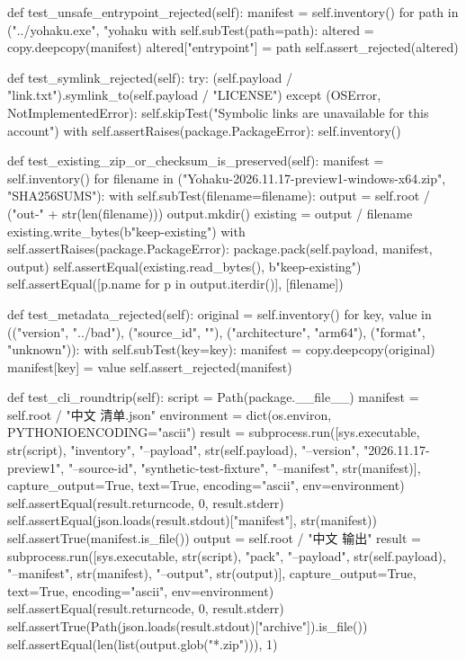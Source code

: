     def test_unsafe_entrypoint_rejected(self):
        manifest = self.inventory()
        for path in ("../yohaku.exe", "yohaku%
            with self.subTest(path=path):
                altered = copy.deepcopy(manifest)
                altered["entrypoint"] = path
                self.assert_rejected(altered)

    def test_symlink_rejected(self):
        try:
            (self.payload / "link.txt").symlink_to(self.payload / "LICENSE")
        except (OSError, NotImplementedError):
            self.skipTest("Symbolic links are unavailable for this account")
        with self.assertRaises(package.PackageError):
            self.inventory()

    def test_existing_zip_or_checksum_is_preserved(self):
        manifest = self.inventory()
        for filename in ("Yohaku-2026.11.17-preview1-windows-x64.zip", "SHA256SUMS"):
            with self.subTest(filename=filename):
                output = self.root / ("out-" + str(len(filename)))
                output.mkdir()
                existing = output / filename
                existing.write_bytes(b"keep-existing")
                with self.assertRaises(package.PackageError):
                    package.pack(self.payload, manifest, output)
                self.assertEqual(existing.read_bytes(), b"keep-existing")
                self.assertEqual([p.name for p in output.iterdir()], [filename])

    def test_metadata_rejected(self):
        original = self.inventory()
        for key, value in (("version", "../bad"), ("source_id", ""),
                           ("architecture", "arm64"), ("format", "unknown")):
            with self.subTest(key=key):
                manifest = copy.deepcopy(original)
                manifest[key] = value
                self.assert_rejected(manifest)

    def test_cli_roundtrip(self):
        script = Path(package.__file__)
        manifest = self.root / "中文 清单.json"
        environment = dict(os.environ, PYTHONIOENCODING="ascii")
        result = subprocess.run([sys.executable, str(script), "inventory", "--payload", str(self.payload),
                                 "--version", "2026.11.17-preview1", "--source-id", "synthetic-test-fixture",
                                 "--manifest", str(manifest)], capture_output=True, text=True,
                                encoding="ascii", env=environment)
        self.assertEqual(result.returncode, 0, result.stderr)
        self.assertEqual(json.loads(result.stdout)["manifest"], str(manifest))
        self.assertTrue(manifest.is_file())
        output = self.root / "中文 输出"
        result = subprocess.run([sys.executable, str(script), "pack", "--payload", str(self.payload),
                                 "--manifest", str(manifest), "--output", str(output)],
                                capture_output=True, text=True, encoding="ascii", env=environment)
        self.assertEqual(result.returncode, 0, result.stderr)
        self.assertTrue(Path(json.loads(result.stdout)["archive"]).is_file())
        self.assertEqual(len(list(output.glob("*.zip"))), 1)

